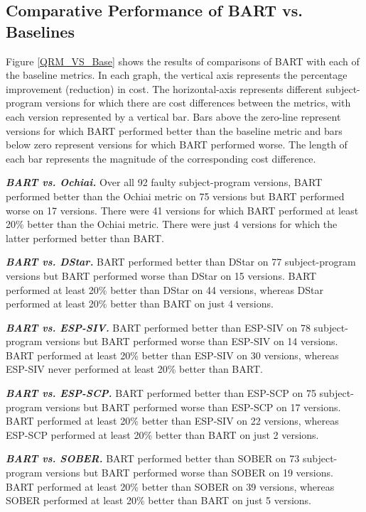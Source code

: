 \subsection{Comparative Performance of BART vs. Baselines}

Figure \ref{QRM_VS_Base} shows the results of comparisons of BART with each of the baseline metrics.  In each graph, the vertical axis represents the percentage improvement (reduction) in cost. The horizontal-axis represents different subject-program versions for which there are cost differences between the metrics, with each version represented by a vertical bar.   Bars above the zero-line represent versions for which BART performed better than the baseline metric and bars below zero represent versions for which BART performed worse.  The length of each bar represents the magnitude of the corresponding cost difference.

\textit{\textbf{ BART vs. Ochiai.}}  Over all 92 faulty subject-program versions, BART performed better than the Ochiai metric on 75 versions but BART performed worse on 17 versions.  There were 41 versions for which BART performed at least 20\% better than the Ochiai metric.  There were just 4 versions for which the latter performed better than BART.

\textit{\textbf{ BART vs. DStar.}}  BART performed better than DStar on 77 subject-program versions but BART performed worse than DStar on 15 versions.  BART performed at least 20\% better than DStar on 44 versions, whereas DStar performed at least 20\% better than BART on just 4 versions.

\textit{\textbf{ BART vs. ESP-SIV.}} BART performed better than ESP-SIV on 78 subject-program versions but BART performed worse than ESP-SIV on 14 versions.  BART performed at least 20\% better than ESP-SIV on 30 versions, whereas ESP-SIV never performed at least 20\% better than BART.

\textit{\textbf{ BART vs. ESP-SCP.}}  BART performed better than ESP-SCP on 75 subject-program versions but BART performed worse than ESP-SCP on 17 versions.  BART performed at least 20\% better than ESP-SIV on 22 versions, whereas ESP-SCP performed at least 20\% better than BART on just 2 versions.

\textit{\textbf{ BART vs. SOBER.}}  BART performed better than SOBER on 73 subject-program versions but BART performed worse than SOBER on 19 versions.  BART performed at least 20\% better than SOBER on 39 versions, whereas SOBER performed at least 20\% better than BART on just 5 versions.

